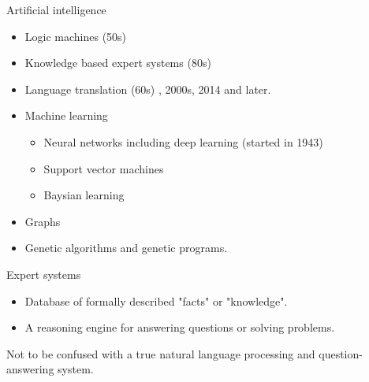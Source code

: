 \begin{frame}{Artificial intelligence}
	\begin{itemize}
		\item Logic machines (50s)
		\item Knowledge based expert systems (80s)
		\item Language translation (60s) , 2000s, 2014 and later.  
		\item Machine learning 
			\begin{itemize}
				\item Neural networks including deep learning (started in 1943)
				\item Support vector machines 
				\item Baysian learning   
			\end{itemize}
		\item Graphs
		\item Genetic algorithms and genetic programs.
	\end{itemize}
\end{frame}


\begin{frame}{Expert systems}
		\begin{itemize}
			\item Database of formally described "facts" or "knowledge". 
			\item A reasoning engine for answering questions or solving problems.  
		\end{itemize}
	Not to be confused with a true natural language processing and 
	question-answering system. 
\end{frame}

